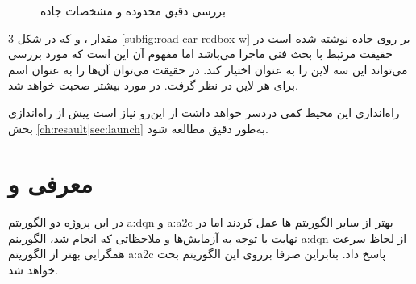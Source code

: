 \begin{figure}[b!]
	\centering
	\caption{
		بررسی دقیق محدوده و مشخصات جاده
	}
	\label{fig:road-car-total}
\end{figure}

3 مقدار  ،  و  که در شکل \ref{subfig:road-car-redbox-w} بر روی جاده نوشته شده است در حقیقت مرتبط با بحث فنی ماجرا می‌باشد اما مفهوم آن این است که  مورد بررسی می‌تواند این سه لاین را به عنوان  اختیار کند. در حقیقت می‌توان آن‌ها را به عنوان اسم برای هر لاین در نظر گرفت. در مورد  بیشتر صحبت خواهد شد.

\begin{note}
	راه‌اندازی این محیط کمی دردسر خواهد داشت از این‌رو نیاز است پیش از راه‌اندازی بخش \ref{ch:resault|sec:launch} به‌طور دقیق مطالعه شود.
\end{note}





\section{معرفی  و }
در این پروژه دو الگوریتم \gls{a:dqn} و \gls{a:a2c} بهتر از سایر الگوریتم ها عمل کردند اما در نهایت با توجه به آزمایش‌ها و ملاحظاتی که انجام شد، الگورینم \gls{a:dqn} از لحاظ سرعت همگرایی بهتر از الگوریتم \gls{a:a2c} پاسخ داد. بنابراین صرفا برروی این الگوریتم بحث خواهد شد.




